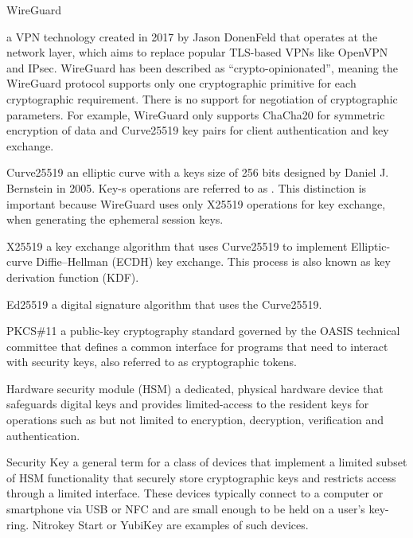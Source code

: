 \documentclass [11pt, proquest] {uwthesis}[2020/02/24]
\begin{document}
\begin{glossary}

\item[WireGuard]

a VPN technology created in 2017 by Jason DonenFeld that operates at the network layer, which aims to replace popular TLS-based VPNs like OpenVPN and IPsec.
WireGuard has been described as “crypto-opinionated”, meaning the WireGuard protocol supports only one cryptographic primitive for each cryptographic requirement.
There is no support for negotiation of cryptographic parameters. For example, WireGuard only supports ChaCha20 for symmetric 
encryption\cite{donenfeld_wireguard_2017} of data and Curve25519 key pairs for client authentication and key exchange.

\item[Curve25519]
an elliptic curve with a keys size of 256 bits designed by Daniel J. Bernstein in 2005\cite{noauthor_curve25519_nodate}. Key-s operations are referred to as . 
This distinction is important because WireGuard uses only X25519 operations for  key exchange, 
when generating the ephemeral session keys.

\item[X25519]
a key exchange algorithm that uses Curve25519 to implement Elliptic-curve Diffie–Hellman (ECDH) key exchange. This process is also known as key derivation function (KDF).

\item[Ed25519] a digital signature algorithm that uses the Curve25519.

\item[PKCS\#11] a public-key cryptography standard governed by the OASIS technical committee\cite{noauthor_cryptsoft_nodate} that defines a common interface for programs that need to interact with security keys, also referred to as cryptographic tokens.

\item[Hardware security module]
(HSM) a dedicated, physical hardware device that safeguards digital keys and provides limited-access to the resident keys for operations such as but not limited to encryption, decryption, verification and authentication. 

\item[Security Key]
a general term for a class of devices that implement a limited subset of HSM functionality that securely store cryptographic keys and restricts access through a limited interface. These devices typically connect to a computer or smartphone via USB or NFC and are small enough to be held on a user's key-ring.
Nitrokey Start\cite{noauthor_nitrokey_nodate} or YubiKey\cite{noauthor_discover_nodate}\cite{noauthor_u2f_nodate-1} are examples of such devices.


\end{glossary}
\end{document}
